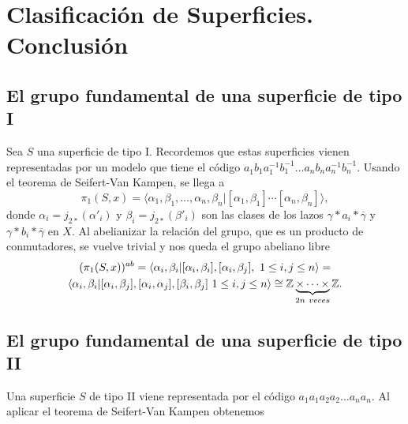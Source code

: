 \documentclass[GTSResumen.tex]{subfiles}
\begin{document}
\renewcommand\chaptername{\Huge Tema}

\titleformat{\chapter}[display]
    {\normalfont\huge\bfseries}{\chaptertitlename\ \thechapter}{10pt}{\Huge}
\titlespacing*{\chapter}{0pt}{-1cm}{10pt}





\setcounter{chapter}{5}

\chapter{Clasificación de Superficies.\\ Conclusión}

\section{El grupo fundamental de una superficie de tipo I}
Sea $S$ una superficie de tipo I. Recordemos que estas superficies vienen representadas por un modelo que tiene el código $a^{}_1b^{}_1a^{-1}_1b^{-1}_1\dots a^{}_nb^{}_na^{-1}_nb^{-1}_n$. Usando el teorema de Seifert-Van Kampen, se llega a 
\[
\pi_1(S,x)=\langle \alpha_1,\beta_1,\dots,\alpha_n,\beta_n|[\alpha_1,\beta_1]\cdots[\alpha_n,\beta_n]\rangle,
\]
donde $\alpha_i=j_{2*}(\alpha'_i)$ y $\beta_i=j_{2*}(\beta'_i)$ son las clases de los lazos  $\gamma*a_i*\overline{\gamma}$ y $\gamma*b_i*\overline{\gamma}$ en $X$. Al abelianizar la relación del grupo, que es un producto de conmutadores, se vuelve trivial y nos queda el grupo abeliano libre
\begin{gather*}
(\pi_1(S,x))^{ab}=\langle \alpha_i, \beta_i|[\alpha_i,\beta_i],[\alpha_i,\beta_j],\ 1\leq i, j\leq n\rangle=\\
\langle \alpha_i, \beta_i|[\alpha_i,\beta_j],[\alpha_i,\alpha_j], [\beta_i,\beta_j]\ 1\leq i, j\leq n\rangle\cong\mathbb{Z}\underbrace{\times\cdots\times}_{2n\ veces}\mathbb{Z}.
\end{gather*}


\section{El grupo fundamental de una superficie de tipo II}
Una superficie $S$ de tipo II viene representada por el código $a_1 a_1 a_2 a_2\dots a_n a_n$. Al aplicar el teorema de Seifert-Van Kampen obtenemos
\end{document}
